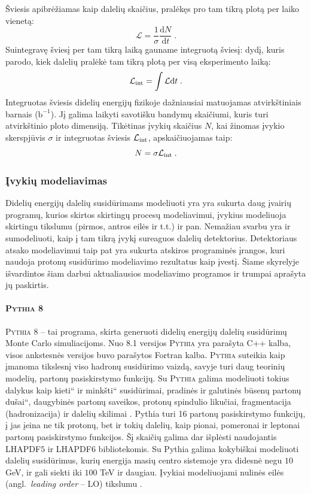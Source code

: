 \documentclass[a4paper, 12pt]{article}
\newcommand{\ltq}[1]{{\quotedblbase{}#1\textquotedblleft{}}}
\newcommand{\Lumi}{{\cal L}_\mathrm{int}}
\newlength\q
\begin{document}
Šviesis apibrėžiamas kaip dalelių skaičius, pralėkęs pro tam tikrą plotą per laiko vienetą:
\begin{equation}
\mathcal{L}=\frac{1}{\sigma}\frac{\mathrm{d}N}{\mathrm{d}t} \; .
\label{eq:luminosity}
\end{equation}
Suintegravę šviesį per tam tikrą laiką gauname integruotą šviesį: dydį, kuris parodo, kiek dalelių pralėkė tam tikrą plotą per visą eksperimento laiką:
\begin{equation}
\Lumi=\int \mathcal{L}\mathrm{d}t \; .
\label{eq:lumiInt}
\end{equation}
Integruotas šviesis didelių energijų fizikoje dažniausiai matuojamas atvirkštiniais barnais ($\mathrm{b}^{-1}$). Jį galima laikyti savotišku bandymų skaičiumi, kuris turi atvirkštinio ploto dimensiją. Tikėtinas įvykių skaičius $N$, kai žinomas įvykio skerspjūvis $\sigma$ ir integruotas šviesis $\Lumi$, apskaičiuojamas taip:
\begin{equation}
N=\sigma\Lumi \; .
\label{eq:evno}
\end{equation}

\subsubsection{Įvykių modeliavimas}
Didelių energijų dalelių susidūrimams modeliuoti yra yra sukurta daug įvairių programų, kurios skirtos skirtingų procesų modeliavimui, įvykius modeliuoja skirtingu tikslumu (pirmos, antros eilės ir t.t.) ir pan. Nemažiau svarbu yra ir sumodeliuoti, kaip į tam tikrą įvykį sureaguos dalelių detektorius. Detektoriaus atsako modeliavimui taip pat yra sukurta atskiros programinės įrangos, kuri naudoja protonų susidūrimo modeliavimo rezultatus kaip įvestį. Šiame skyrelyje išvardintos šiam darbui aktualiausios modeliavimo programos ir trumpai aprašyta jų paskirtis.
\paragraph{\textsc{Pythia} 8\\}
\textsc{Pythia} 8 -- tai programa, skirta generuoti didelių energijų dalelių susidūrimų Monte Carlo simuliacijoms. Nuo 8.1 versijos \textsc{Pythia} yra parašyta C++ kalba, visos ankstesnės versijos buvo parašytos Fortran kalba. \textsc{Pythia} suteikia kaip įmanoma tikslesnį viso hadronų susidūrimo vaizdą, savyje turi daug teorinių modelių, partonų pasiskirstymo funkcijų. Su \textsc{Pythia} galima modeliuoti tokius dalykus kaip \ltq{kieti} ir \ltq{minkšti} susidūrimai, pradinės ir galutinės būsenų partonų \ltq{dušai}, daugybinės partonų saveikos, protonų spindulio likučiai, fragmentacija (hadronizacija) ir dalelių skilimai \cite{pythia81}. Pythia turi 16 partonų pasiskirstymo funkcijų, į jas įeina ne tik protonų, bet ir tokių dalelių, kaip pionai, pomeronai ir leptonai partonų pasiskirstymo funkcijos. Šį skaičių galima dar išplėsti naudojantis LHAPDF$5$ ir LHAPDF$6$ bibliotekomis.
Su Pythia galima kokybiškai modeliuoti dalelių susidūrimus, kurių energija masių centro sistemoje yra didesnė negu $10$ GeV, ir gali siekti iki $100$ TeV ir daugiau. Įvykiai modeliuojami nulinės eilės (angl.\ \textit{leading order} -- LO) tikslumu \cite{pythia82}.
\end{document}
